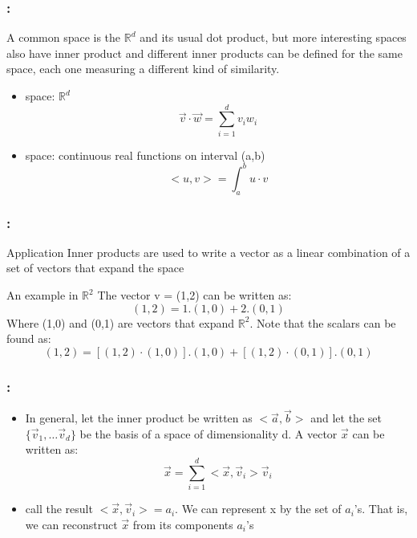 \documentclass{beamer}
\begin{document}
\begin{frame}
  \frametitle{\secname : \subsecname}
  A common space is the $\mathbb{R}^d$ and its usual dot product, but more interesting spaces also have inner product and
  different inner products can be defined for the same space, each one measuring a different kind of similarity. 
  \begin{itemize}
    \item space: $\mathbb{R}^d$
      \begin{equation}
        \vec{v} \cdot \vec{w} = \sum_{i=1}^{d} v_i w_i
      \end{equation}

      \item space: continuous real functions on interval (a,b)
      \begin{equation}
        <u,v> = \int_a^b u \cdot v
      \end{equation}

  \end{itemize}

\end{frame}

\begin{frame}
  \frametitle{\secname : \subsecname}
  \begin{block}{Application}
    Inner products are used to write a vector as a linear combination of a set of vectors that expand the space
  \end{block}
  \begin{exampleblock}{An example in $\mathbb{R}^2$}
    The vector v = (1,2) can be written as:
    \begin{equation}
      (1,2) = 1 . (1,0) + 2 . (0,1)
    \end{equation}
    Where (1,0) and (0,1) are vectors that expand $\mathbb{R}^2$. Note that the scalars can be found as:
    \begin{equation}
      (1,2) = [(1,2)\cdot(1,0)] . (1,0) + [(1,2)\cdot(0,1)] . (0,1)
    \end{equation}
  \end{exampleblock}
\end{frame}

\begin{frame}
  \frametitle{\secname : \subsecname}
  \begin{itemize}
    \item In general, let the inner product be written as $<\vec{a},\vec{b}>$ and let the set $\{\vec{v}_1, \ldots
      \vec{v}_d\}$ be the basis of a space of dimensionality d. A vector $\vec{x}$ can be written as:
      \begin{equation}
        \vec{x} = \sum_{i=1}^d <\vec{x},\vec{v}_i> \vec{v}_i
      \end{equation}
    \item call the result $<\vec{x},\vec{v}_i> = a_i$. We can represent x by the set of $a_i$'s. That is, we can
      reconstruct $\vec{x}$ from its components $a_i$'s
  \end{itemize}
\end{frame}
\end{document}
